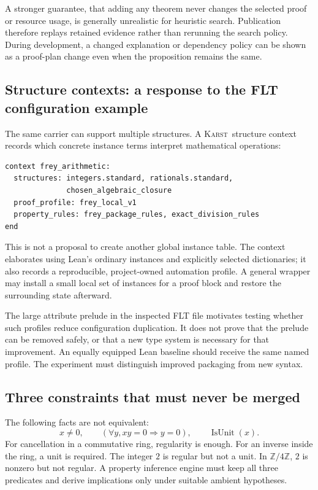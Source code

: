 \documentclass[11pt,letterpaper]{article}
\newcommand{\Karst}{\textsc{Karst}}
\newcommand{\Z}{\mathbb Z}
\theoremstyle{remark}
\begin{document}
A stronger guarantee, that adding any theorem never changes the selected proof
or resource usage, is generally unrealistic for heuristic search. Publication
therefore replays retained evidence rather than rerunning the search policy.
During development, a changed explanation or dependency policy can be shown as
a proof-plan change even when the proposition remains the same.

\subsection{Structure contexts: a response to the FLT configuration example}
The same carrier can support multiple structures. A \Karst\ structure context
records which concrete instance terms interpret mathematical operations:
\begin{lstlisting}[caption={A proposed named structure and automation context.}]
context frey_arithmetic:
  structures: integers.standard, rationals.standard,
              chosen_algebraic_closure
  proof_profile: frey_local_v1
  property_rules: frey_package_rules, exact_division_rules
end
\end{lstlisting}

This is not a proposal to create another global instance table. The context
elaborates using Lean's ordinary instances and explicitly selected dictionaries;
it also records a reproducible, project-owned automation profile. A general
wrapper may install a small local set of instances for a proof block and
restore the surrounding state afterward.

The large attribute prelude in the inspected FLT file motivates testing whether
such profiles reduce configuration duplication. It does not prove that the
prelude can be removed safely, or that a new type system is necessary for that
improvement. An equally equipped Lean baseline should receive the same named
profile. The experiment must distinguish improved packaging from new syntax.

\subsection{Three constraints that must never be merged}
The following facts are not equivalent:
\[
 x\ne0,\qquad
 (\forall y,xy=0\Rightarrow y=0),\qquad
 \operatorname{IsUnit}(x).
\]
For cancellation in a commutative ring, regularity is enough. For an inverse
inside the ring, a unit is required. The integer $2$ is regular but not a unit.
In $\Z/4\Z$, $2$ is nonzero but not regular. A property inference engine must
keep all three predicates and derive implications only under suitable ambient
hypotheses.
\end{document}
